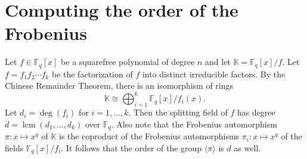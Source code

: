 \documentclass{article}
\theoremstyle{plain}
\theoremstyle{definition}
\newcommand{\lrang}[1]{\langle#1\rangle}
\DeclareMathOperator{\lcm}{lcm} %
\def\K{\ensuremath{\mathbb{K}}}
\def\F{\ensuremath{\mathbb{F}}}
\begin{document}

\section{Computing the order of the Frobenius}

Let $f \in \F_q[x]$ be a squarefree polynomial of degree $n$ and let $\K = \F_q[x] / f$. Let $f = 
f_1f_2 \cdots f_k$ be the factorization of $f$ into distinct irreducible factors. By the Chinese 
Remainder Theorem, there is an isomorphism of rings
\begin{equation}
\label{equ:crt}
	\K \cong \bigoplus_{i = 1}^k \F_q[x] / f_i(x).
\end{equation}
Let $d_i = \deg(f_i)$ for $i = 1, \dots, k$. Then the splitting field of $f$ has degree $d = 
\lcm(d_1, \dots, d_k)$ over $\F_q$. Also note that the Frobenius automorphism $\pi: x \mapsto x^q$ 
of $\K$ is the coproduct of the Frobenius automorphisms $\pi_i: x \mapsto x^q$ of the fields 
$\F_q[x] / f_i$. It follows that the order of the group $\lrang{\pi}$ is $d$ as well.
\end{document}
